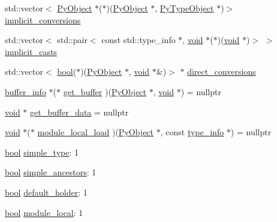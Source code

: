\begin{DoxyCompactItemize}
\item 
std\+::vector$<$ \mbox{\hyperlink{_python27_2object_8h_aadc84ac7aed2cfa6f20c25f62bf3dac7}{Py\+Object}} $\ast$($\ast$)(\mbox{\hyperlink{_python27_2object_8h_aadc84ac7aed2cfa6f20c25f62bf3dac7}{Py\+Object}} $\ast$, \mbox{\hyperlink{_python27_2object_8h_a42a55dd6e973872c7a6bc61632070f6f}{Py\+Type\+Object}} $\ast$)$>$ \mbox{\hyperlink{structtype__info_aea372863c3f5dfb6d5625480373ce432}{implicit\+\_\+conversions}}
\item 
std\+::vector$<$ std\+::pair$<$ const std\+::type\+\_\+info $\ast$, \mbox{\hyperlink{_s_d_l__opengles2__gl2ext_8h_ae5d8fa23ad07c48bb609509eae494c95}{void}} $\ast$($\ast$)(\mbox{\hyperlink{_s_d_l__opengles2__gl2ext_8h_ae5d8fa23ad07c48bb609509eae494c95}{void}} $\ast$)$>$ $>$ \mbox{\hyperlink{structtype__info_ae87b2f5ab971392a547757b0cf0c173e}{implicit\+\_\+casts}}
\item 
std\+::vector$<$ \mbox{\hyperlink{asdl_8h_af6a258d8f3ee5206d682d799316314b1}{bool}}($\ast$)(\mbox{\hyperlink{_python27_2object_8h_aadc84ac7aed2cfa6f20c25f62bf3dac7}{Py\+Object}} $\ast$, \mbox{\hyperlink{_s_d_l__opengles2__gl2ext_8h_ae5d8fa23ad07c48bb609509eae494c95}{void}} $\ast$\&)$>$ $\ast$ \mbox{\hyperlink{structtype__info_ad1ea3e4746ea66e67520e829541efd95}{direct\+\_\+conversions}}
\item 
\mbox{\hyperlink{structbuffer__info}{buffer\+\_\+info}} $\ast$($\ast$ \mbox{\hyperlink{structtype__info_ae6e0ffbd11cb347896494ead333b8e4d}{get\+\_\+buffer}} )(\mbox{\hyperlink{_python27_2object_8h_aadc84ac7aed2cfa6f20c25f62bf3dac7}{Py\+Object}} $\ast$, \mbox{\hyperlink{_s_d_l__opengles2__gl2ext_8h_ae5d8fa23ad07c48bb609509eae494c95}{void}} $\ast$) = nullptr
\item 
\mbox{\hyperlink{_s_d_l__opengles2__gl2ext_8h_ae5d8fa23ad07c48bb609509eae494c95}{void}} $\ast$ \mbox{\hyperlink{structtype__info_a610a9a58683d2cb70158fd084bd1f30b}{get\+\_\+buffer\+\_\+data}} = nullptr
\item 
\mbox{\hyperlink{_s_d_l__opengles2__gl2ext_8h_ae5d8fa23ad07c48bb609509eae494c95}{void}} $\ast$($\ast$ \mbox{\hyperlink{structtype__info_a22057dde59f6dac304c12c97286222c8}{module\+\_\+local\+\_\+load}} )(\mbox{\hyperlink{_python27_2object_8h_aadc84ac7aed2cfa6f20c25f62bf3dac7}{Py\+Object}} $\ast$, const \mbox{\hyperlink{structtype__info}{type\+\_\+info}} $\ast$) = nullptr
\item 
\mbox{\hyperlink{asdl_8h_af6a258d8f3ee5206d682d799316314b1}{bool}} \mbox{\hyperlink{structtype__info_a106e005c60fd65fbf01569e25b52fe50}{simple\+\_\+type}}\+: 1
\item 
\mbox{\hyperlink{asdl_8h_af6a258d8f3ee5206d682d799316314b1}{bool}} \mbox{\hyperlink{structtype__info_aaa5c825d7f12a1312174bd566e825199}{simple\+\_\+ancestors}}\+: 1
\item 
\mbox{\hyperlink{asdl_8h_af6a258d8f3ee5206d682d799316314b1}{bool}} \mbox{\hyperlink{structtype__info_ac917cda35113f21ca3951c4d11f2aa71}{default\+\_\+holder}}\+: 1
\item 
\mbox{\hyperlink{asdl_8h_af6a258d8f3ee5206d682d799316314b1}{bool}} \mbox{\hyperlink{structtype__info_a800bae8b10c62683b4367268a37be661}{module\+\_\+local}}\+: 1
\end{DoxyCompactItemize}


